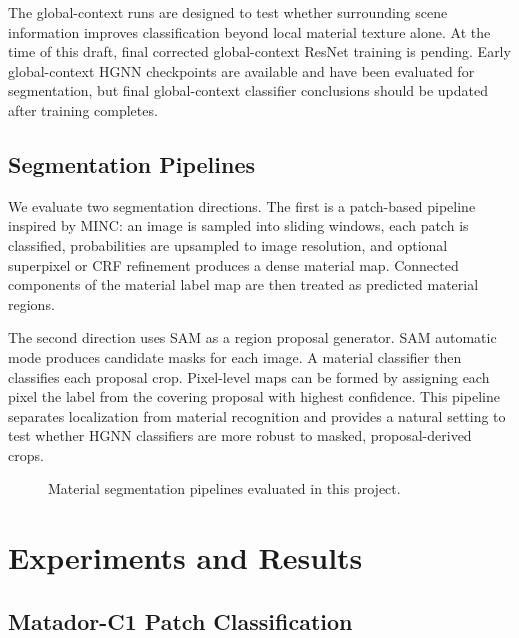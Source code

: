 \documentclass[11pt,twocolumn,letterpaper]{article}
\begin{document}
The global-context runs are designed to test whether surrounding scene information improves classification beyond local material texture alone. At the time of this draft, final corrected global-context ResNet training is pending. Early global-context HGNN checkpoints are available and have been evaluated for segmentation, but final global-context classifier conclusions should be updated after training completes.

\subsection{Segmentation Pipelines}

We evaluate two segmentation directions. The first is a patch-based pipeline inspired by MINC: an image is sampled into sliding windows, each patch is classified, probabilities are upsampled to image resolution, and optional superpixel or CRF refinement produces a dense material map. Connected components of the material label map are then treated as predicted material regions.

The second direction uses SAM as a region proposal generator. SAM automatic mode produces candidate masks for each image. A material classifier then classifies each proposal crop. Pixel-level maps can be formed by assigning each pixel the label from the covering proposal with highest confidence. This pipeline separates localization from material recognition and provides a natural setting to test whether HGNN classifiers are more robust to masked, proposal-derived crops.

\begin{figure}[t]
    \centering
    \caption{Material segmentation pipelines evaluated in this project.}
    \label{fig:pipeline}
\end{figure}

\section{Experiments and Results}

\subsection{Matador-C1 Patch Classification}
\end{document}
